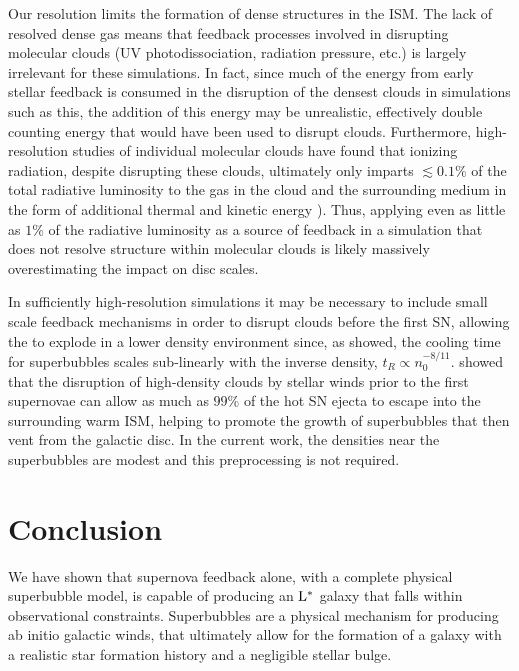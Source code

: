 Our resolution limits the formation of dense structures in the ISM.  The lack of
resolved dense gas means that feedback processes involved in disrupting
molecular clouds (UV photodissociation, radiation pressure, etc.) is largely
irrelevant for these simulations.  In fact, since much of the energy from early
stellar feedback is consumed in the disruption of the densest clouds in
simulations such as this, the addition of this energy may be unrealistic,
effectively double counting energy that would have been used to disrupt clouds.
Furthermore, high-resolution studies of individual molecular clouds have found
that ionizing radiation, despite disrupting these clouds, ultimately only
imparts $\lesssim 0.1\%$ of the total radiative luminosity to the gas in the
cloud and the surrounding medium in the form of additional thermal and kinetic
energy \citep{Dale2005, Gendelev2012, Walch2012}).  Thus, applying even as
little as $1\%$ of the radiative luminosity as a source of feedback in a
simulation that does not resolve structure within molecular clouds is likely
massively overestimating the impact on disc scales.

In sufficiently high-resolution simulations it may be necessary to include small
scale feedback mechanisms in order to disrupt clouds before the first SN,
allowing the to explode in a lower density environment since, as
\citet{MacLow1988} showed, the cooling time for superbubbles scales sub-linearly
with the inverse density, $t_R\propto n_0^{-8/11}$.  \citet{Rogers2013} showed
that the disruption of high-density clouds by stellar winds prior to the first
supernovae can allow as much as $99\%$ of the hot SN ejecta to escape into the
surrounding warm ISM, helping to promote the growth of superbubbles that then
vent from the galactic disc.  In the current work, the densities near the
superbubbles are modest and this preprocessing is not required.

\section{Conclusion}

We have shown that supernova feedback alone, with a complete physical
superbubble model, is capable of producing an $\rm{L^*}$ galaxy that falls
within observational constraints.  Superbubbles are a physical mechanism for
producing ab initio galactic winds, that ultimately allow for the formation of a
galaxy with a realistic star formation history and a negligible stellar bulge.

